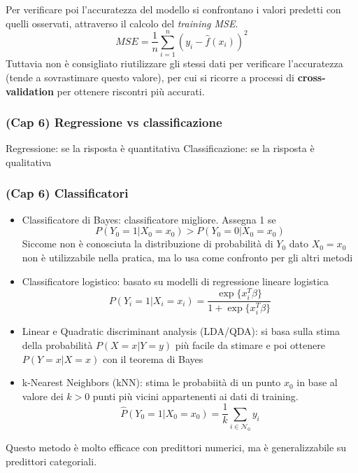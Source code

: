 \documentclass[
]{article}
\begin{document}
Per verificare poi l'accuratezza del modello si confrontano i valori
predetti con quelli osservati, attraverso il calcolo del \emph{training
MSE}. \[ MSE = \frac{1}{n} \sum_{i=1}^n (y_i - \hat{f}(x_i))^2 \]
Tuttavia non è consigliato riutilizzare gli stessi dati per verificare
l'accuratezza (tende a sovrastimare questo valore), per cui si ricorre a
processi di \textbf{cross-validation} per ottenere riscontri più
accurati.

\hypertarget{cap-6-regressione-vs-classificazione}{%
\subsubsection{(Cap 6) Regressione vs
classificazione}\label{cap-6-regressione-vs-classificazione}}

Regressione: se la risposta è quantitativa Classificazione: se la
risposta è qualitativa

\hypertarget{cap-6-classificatori}{%
\subsubsection{(Cap 6) Classificatori}\label{cap-6-classificatori}}

\begin{itemize}
\item
  Classificatore di Bayes: classificatore migliore. Assegna 1 se
  \[P(Y_0 = 1 | X_0 = x_0) > P(Y_0 = 0 | X_0 = x_0)\] Siccome non è
  conosciuta la distribuzione di probabilità di \(Y_0\) dato \(X_0=x_0\)
  non è utilizzabile nella pratica, ma lo usa come confronto per gli
  altri metodi
\item
  Classificatore logistico: basato su modelli di regressione lineare
  logistica
  \[P(Y_i = 1 | X_i = x_i) = \frac{\exp\{x_i^T\beta\}}{1+\exp\{x_i^T\beta\}}\]
\item
  Linear e Quadratic discriminant analysis (LDA/QDA): si basa sulla
  stima della probabilità \(P(X = x | Y = y)\) più facile da stimare e
  poi ottenere \(P(Y = x | X = x)\) con il teorema di Bayes
\item
  k-Nearest Neighbors (kNN): stima le probabiità di un punto \(x_0\) in
  base al valore dei \(k>0\) punti più vicini appartenenti ai dati di
  training.
  \[ \hat{P}(Y_0 = 1 | X_0 = x_0) = \frac{1}{k}\sum_{i \in \mathcal{N_0}} y_i \]
\end{itemize}

Questo metodo è molto efficace con predittori numerici, ma è
generalizzabile su predittori categoriali.
\end{document}
